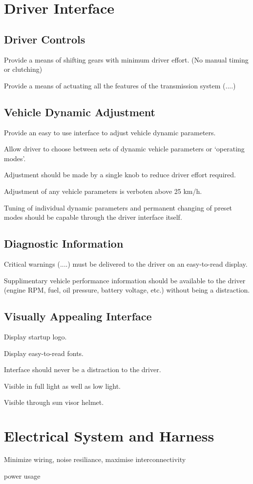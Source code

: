 


\section{Driver Interface}


\subsection{Driver Controls}

Provide a means of shifting gears with minimum driver effort. (No
manual timing or clutching)

Provide a means of actuating all the features of the transmission
system (....)


\subsection{Vehicle Dynamic Adjustment}

Provide an easy to use interface to adjust vehicle dynamic parameters.

Allow driver to choose between sets of dynamic vehicle parameters
or `operating modes'.

Adjustment should be made by a single knob to reduce driver effort
required.

Adjustment of any vehicle parameters is verboten above 25 km/h.

Tuning of individual dynamic parameters and permanent changing of
preset modes should be capable through the driver interface itself.


\subsection{Diagnostic Information}

Critical warnings (....) must be delivered to the driver on an easy-to-read
display.

Supplimentary vehicle performance information should be available
to the driver (engine RPM, fuel, oil pressure, battery voltage, etc.)
without being a distraction.


\subsection{Visually Appealing Interface}

Display startup logo.

Display easy-to-read fonts.

Interface should never be a distraction to the driver.

Visible in full light as well as low light.

Visible through sun visor helmet.


\section{Electrical System and Harness}

Minimize wiring, noise resiliance, maximise interconnectivity

power usage